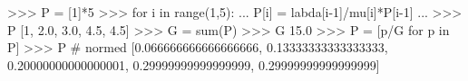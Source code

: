 
>>> P = [1]*5
>>> for i in range(1,5):
...     P[i] = labda[i-1]/mu[i]*P[i-1]
...
>>> P
[1, 2.0, 3.0, 4.5, 4.5]
>>> G = sum(P)
>>> G
15.0
>>> P = [p/G for p in P]
>>> P # normed
[0.066666666666666666, 0.13333333333333333, 0.20000000000000001,
0.29999999999999999, 0.29999999999999999]

